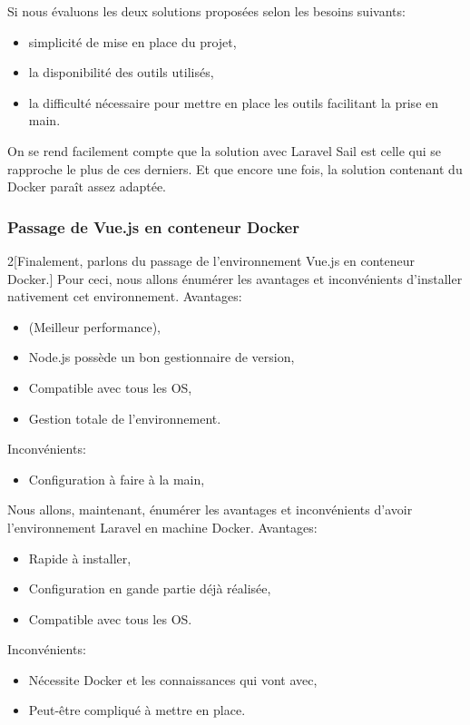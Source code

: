 \documentclass[
    iai, %
    il, %
]{heig-tb}
\begin{document}
Si nous évaluons les deux solutions proposées selon les besoins suivants:
\begin{itemize}
    \item simplicité de mise en place du projet,
    \item la disponibilité des outils utilisés,
    \item la difficulté nécessaire pour mettre en place les outils facilitant la prise en main.
\end{itemize}

On se rend facilement compte que la solution avec Laravel Sail est celle qui se rapproche le plus de ces derniers. Et que encore une fois, la solution contenant du Docker paraît assez adaptée.


\subsubsection{Passage de Vue.js en conteneur Docker}
\begin{multicols}{2}[Finalement, parlons du passage de l'environnement Vue.js en conteneur Docker.]
    Pour ceci, nous allons énumérer les avantages et inconvénients d'installer nativement cet environnement.
    Avantages:
    \begin{itemize}
        \item (Meilleur performance),
        \item Node.js possède un bon gestionnaire de version,
        \item Compatible avec tous les OS,
        \item Gestion totale de l'environnement.
    \end{itemize}

    Inconvénients:
    \begin{itemize}
        \item Configuration à faire à la main,
    \end{itemize}

    \columnbreak
    Nous allons, maintenant, énumérer les avantages et inconvénients d'avoir l'environnement Laravel en machine Docker.
    Avantages:
    \begin{itemize}
        \item Rapide à installer,
        \item Configuration en gande partie déjà réalisée,
        \item Compatible avec tous les OS.
    \end{itemize}

    Inconvénients:
    \begin{itemize}
        \item Nécessite Docker et les connaissances qui vont avec,
        \item Peut-être compliqué à mettre en place.
    \end{itemize}
\end{multicols}
\end{document}
